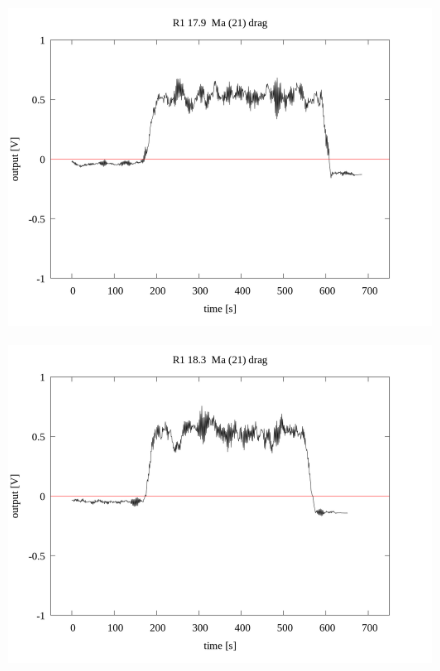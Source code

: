 \documentclass[a4paper]{jsarticle}
\begin{document}
\begin{figure}[htbp]
    \footnotesize
    \begin{center}
        \includegraphics[width=140mm]{../../../33_result/210806/moving_average/21/drag/R1_17.9_ma(21)_drag.png}
    \end{center}
\end{figure}

\begin{figure}[htbp]
    \footnotesize
    \begin{center}
        \includegraphics[width=140mm]{../../../33_result/210806/moving_average/21/drag/R1_18.6_ma(21)_drag.png}
    \end{center}
\end{figure}
\end{document}
